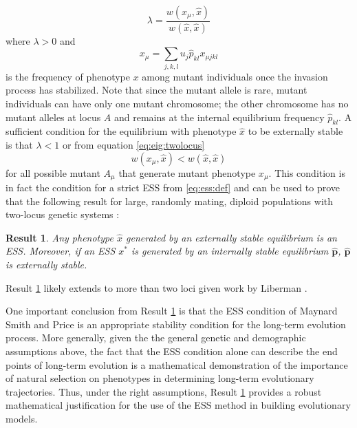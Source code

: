 \documentclass[11pt]{article}
\newcommand{\ess}[1]{#1^*}
\newcommand{\fixp}[1]{\hat{#1}}
\renewcommand{\vec}[1]{\symbf{#1}}
\newcommand{\mut}{\mu}
\newcommand{\eig}{\lambda}
\newtheorem{result}{Result}
\begin{document}
\begin{equation}
  \label{eq:eig:twolocus}
  \eig = \frac{w(x_{\mut}, \fixp{x})}{w(\fixp{x}, \fixp{x})}
\end{equation}
where $\eig>0$ and
\begin{equation}
  \label{eq:mut:pheno:twolocus}
  x_{\mut} = \sum_{j,k,l} u_{j} \fixp{p}_{kl} x_{\mut jkl}
\end{equation}
is the frequency of phenotype $x$ among mutant individuals once the invasion process has stabilized. Note that since the mutant allele is rare, mutant individuals can have only one mutant chromosome; the other chromosome has no mutant alleles at locus $A$ and remains at the internal equilibrium frequency $\fixp{p}_{kl}$. A sufficient condition for the equilibrium with phenotype $\fixp{x}$ to be externally stable is that $\eig < 1$ or from equation \eqref{eq:eig:twolocus}
\begin{equation*}
  w(x_{\mut}, \fixp{x}) < w(\fixp{x}, \fixp{x})
\end{equation*}
for all possible mutant $A_{\mut}$ that generate mutant phenotype $x_{\mut}$. This condition is in fact the condition for a strict ESS from \eqref{eq:ess:def} and can be used to prove that the following result for large, randomly mating, diploid populations with two-locus genetic systems \cite{Eshel:Feldman:1984,Eshel:1996,Eshel:Feldman:1998}:
\begin{result}
  \label{res:twolocus}
  Any phenotype $\fixp{x}$ generated by an externally stable equilibrium is an ESS. Moreover, if an ESS $\ess{x}$ is generated by an internally stable equilibrium $\fixp{\vec{p}}$, $\fixp{\vec{p}}$ is externally stable.
\end{result}
\noindent
Result \ref{res:twolocus} likely extends to more than two loci given work by Liberman \cite{Liberman:1988}.

One important conclusion from Result \ref{res:twolocus} is that the ESS condition of Maynard Smith and Price \cite{Maynard-Smith:Price:1973,Maynard-Smith:1974} is an appropriate stability condition for the long-term evolution process. More generally, given the the general genetic and demographic assumptions above, the fact that the ESS condition alone can describe the end points of long-term evolution is a mathematical demonstration of the importance of natural selection on phenotypes in determining long-term evolutionary trajectories. Thus, under the right assumptions, Result \ref{res:twolocus} provides a robust mathematical justification for the use of the ESS method in building evolutionary models.
\end{document}
